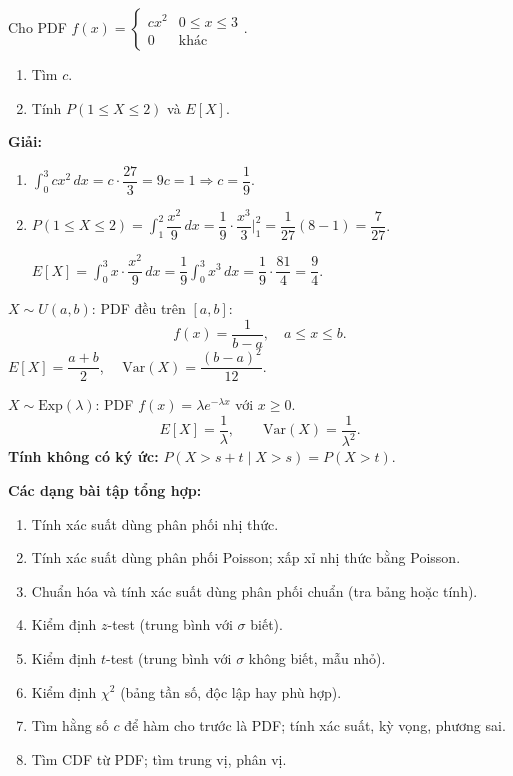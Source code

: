 \documentclass[12pt,a4paper]{article}
\begin{document}
\begin{vidu}
  Cho PDF $f(x) = \begin{cases} cx^2 & 0 \le x \le 3 \\ 0 & \text{khác}\end{cases}$.
  \begin{enumerate}[label=(\alph*)]
    \item Tìm $c$.
    \item Tính $P(1 \le X \le 2)$ và $E[X]$.
  \end{enumerate}

  \medskip\textbf{Giải:}
  \begin{enumerate}[label=(\alph*)]
    \item $\displaystyle\int_0^3 cx^2\,dx = c\cdot\dfrac{27}{3} = 9c = 1 \Rightarrow c = \dfrac{1}{9}$.

    \item $P(1 \le X \le 2) = \displaystyle\int_1^2 \dfrac{x^2}{9}\,dx = \dfrac{1}{9}\cdot\dfrac{x^3}{3}\Big|_1^2 = \dfrac{1}{27}(8-1) = \dfrac{7}{27}$.

      $E[X] = \displaystyle\int_0^3 x \cdot \dfrac{x^2}{9}\,dx = \dfrac{1}{9}\int_0^3 x^3\,dx = \dfrac{1}{9}\cdot\dfrac{81}{4} = \dfrac{9}{4}$.
  \end{enumerate}
\end{vidu}

\begin{congthuc}[title={Phân phối đều liên tục}]
  $X \sim U(a,b)$: PDF đều trên $[a,b]$:
  \[
    f(x) = \frac{1}{b-a}, \quad a \le x \le b.
  \]
  $E[X] = \dfrac{a+b}{2}$, $\quad \text{Var}(X) = \dfrac{(b-a)^2}{12}$.
\end{congthuc}

\begin{congthuc}[title={Phân phối mũ (Exponential)}]
  $X \sim \text{Exp}(\lambda)$: PDF $f(x) = \lambda e^{-\lambda x}$ với $x \ge 0$.
  \[
    E[X] = \frac{1}{\lambda}, \qquad \text{Var}(X) = \frac{1}{\lambda^2}.
  \]
  \textbf{Tính không có ký ức:} $P(X > s+t \mid X > s) = P(X > t)$.
\end{congthuc}

\medskip\noindent\textbf{Các dạng bài tập tổng hợp:}
\begin{enumerate}[label=\textbf{Dạng \arabic*:}, leftmargin=*, align=left]
  \item Tính xác suất dùng phân phối nhị thức.
  \item Tính xác suất dùng phân phối Poisson; xấp xỉ nhị thức bằng Poisson.
  \item Chuẩn hóa và tính xác suất dùng phân phối chuẩn (tra bảng hoặc tính).
  \item Kiểm định $z$-test (trung bình với $\sigma$ biết).
  \item Kiểm định $t$-test (trung bình với $\sigma$ không biết, mẫu nhỏ).
  \item Kiểm định $\chi^2$ (bảng tần số, độc lập hay phù hợp).
  \item Tìm hằng số $c$ để hàm cho trước là PDF; tính xác suất, kỳ vọng, phương sai.
  \item Tìm CDF từ PDF; tìm trung vị, phân vị.
\end{enumerate}
\end{document}
